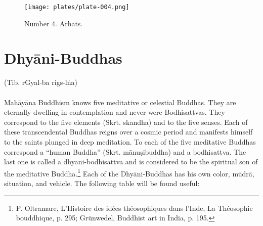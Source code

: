 \documentclass[a4paper, 12pt, oneside]{article}
\begin{document}
\clearpage
\vspace*{\fill}
\begin{figure}[H]
\centering
\texttt{[image: plates/plate-004.png]}
\caption*{Number 4. Arhats.}
\end{figure}
\vspace*{\fill}
\clearpage
\section{Dhy\={a}ni-Buddhas}
\begin{center}
(Tib. rGyal-ba rigs-l\.{n}a)
\end{center}
\paragraph{}
Mah\={a}y\={a}na Buddhism knows five meditative or celestial Buddhas. They are eternally dwelling in contemplation and never were Bodhisattvas. They correspond to the five elements (Skrt. skandha) and to the five senses. Each of these transcendental Buddhas reigns over a cosmic period and manifests himself to the saints plunged in deep meditation. To each of the five meditative Buddhas correspond a ``human Buddha'' (Skrt. m\={a}nu\d{s}ibuddha) and a bodhisattva. The last one is called a dhy\={a}ni-bodhisattva and is considered to be the spiritual son of the meditative Buddha.\footnote{P. Oltramare, L'Histoire des idées théosophiques dans l'Inde, La Théosophie bouddhique, p. 295; Grünwedel, Buddhist art in India, p. 195.} Each of the Dhy\={a}ni-Buddhas has his own color, m\={u}dr\={a}, situation, and vehicle. The following table will be found useful:
\end{document}
